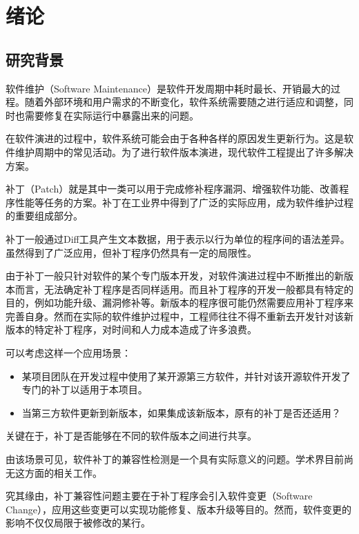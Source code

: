 \chapter{绪论}
\section{研究背景}
\label{sec:background}

软件维护（Software Maintenance）是软件开发周期中耗时最长、开销最大的过程\cite{lehnert2011review}。随着外部环境和用户需求的不断变化，软件系统需要随之进行适应和调整，同时也需要修复在实际运行中暴露出来的问题。

在软件演进的过程中，软件系统可能会由于各种各样的原因发生更新行为。这是软件维护周期中的常见活动\cite{pigoski1996practical}。为了进行软件版本演进，现代软件工程提出了许多解决方案。

补丁（Patch）就是其中一类可以用于完成修补程序漏洞、增强软件功能、改善程序性能等任务的方案。补丁在工业界中得到了广泛的实际应用，成为软件维护过程的重要组成部分\cite{le2014patch}。

补丁一般通过Diff工具产生文本数据\cite{hunt1976algorithm}，用于表示以行为单位的程序间的语法差异。虽然得到了广泛应用，但补丁程序仍然具有一定的局限性。

由于补丁一般只针对软件的某个专门版本开发，对软件演进过程中不断推出的新版本而言，无法确定补丁程序是否同样适用。而且补丁程序的开发一般都具有特定的目的，例如功能升级、漏洞修补等。新版本的程序很可能仍然需要应用补丁程序来完善自身。然而在实际的软件维护过程中，工程师往往不得不重新去开发针对该新版本的特定补丁程序，对时间和人力成本造成了许多浪费。

可以考虑这样一个应用场景：

\begin{itemize}
	\item 某项目团队在开发过程中使用了某开源第三方软件，并针对该开源软件开发了专门的补丁以适用于本项目。
	\item 当第三方软件更新到新版本，如果集成该新版本，原有的补丁是否还适用？
\end{itemize}

关键在于，补丁是否能够在不同的软件版本之间进行共享。

由该场景可见，软件补丁的兼容性检测是一个具有实际意义的问题。学术界目前尚无这方面的相关工作。

究其缘由，补丁兼容性问题主要在于补丁程序会引入软件变更（Software Change）\cite{buckley2005towards}，应用这些变更可以实现功能修复、版本升级等目的。然而，软件变更的影响不仅仅局限于被修改的某行。

